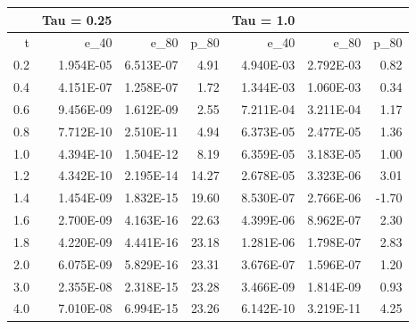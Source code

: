 \documentclass[letterpaper, 12pt]{article}
\begin{document}
	\begin{tabular}{r|rrr|rrr}
							 &Tau = 0.25   &						 &						 &Tau = 1.0		 &						 &		  \\
		\hline
		  t        &e\_40        &e\_80        &p\_80        &e\_40        &e\_80        &p\_80 \\ 
		\hline
		0.2    &1.954E-05    &6.513E-07         &4.91    &4.940E-03    &2.792E-03         &0.82 \\ 
		0.4    &4.151E-07    &1.258E-07         &1.72    &1.344E-03    &1.060E-03         &0.34 \\ 
		0.6    &9.456E-09    &1.612E-09         &2.55    &7.211E-04    &3.211E-04         &1.17 \\ 
		0.8    &7.712E-10    &2.510E-11         &4.94    &6.373E-05    &2.477E-05         &1.36 \\ 
		1.0    &4.394E-10    &1.504E-12         &8.19    &6.359E-05    &3.183E-05         &1.00 \\ 
		1.2    &4.342E-10    &2.195E-14        &14.27    &2.678E-05    &3.323E-06         &3.01 \\ 
		1.4    &1.454E-09    &1.832E-15        &19.60    &8.530E-07    &2.766E-06        &-1.70 \\ 
		1.6    &2.700E-09    &4.163E-16        &22.63    &4.399E-06    &8.962E-07         &2.30 \\ 
		1.8    &4.220E-09    &4.441E-16        &23.18    &1.281E-06    &1.798E-07         &2.83 \\ 
		2.0    &6.075E-09    &5.829E-16        &23.31    &3.676E-07    &1.596E-07         &1.20 \\ 
		3.0    &2.355E-08    &2.318E-15        &23.28    &3.466E-09    &1.814E-09         &0.93 \\ 
		4.0    &7.010E-08    &6.994E-15        &23.26    &6.142E-10    &3.219E-11         &4.25 \\ 
	\end{tabular}
	
\end{document}

